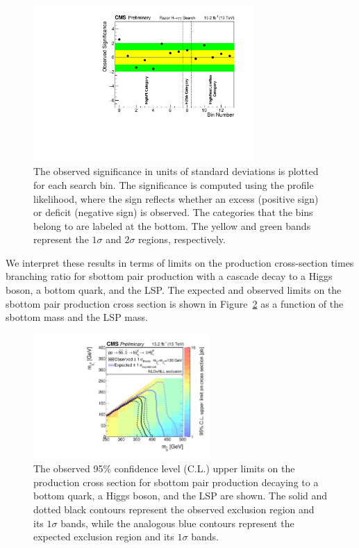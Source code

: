 \begin{figure}[ht!]
\centering
\includegraphics[width=0.75\textwidth, angle=0.]{figs/SignificanceVsBin.pdf}
\caption{ 
The observed significance in units of standard deviations
is plotted for each search bin. The significance is computed using the profile likelihood, where the sign
reflects whether an excess (positive sign) or deficit (negative sign) is observed. 
The categories that the bins belong to are labeled at the bottom.
The yellow and green bands represent the $1\sigma$ and $2\sigma$
regions, respectively. 
\label{fig:Significance}}
\end{figure}


We interpret these results in terms of limits on the production cross-section times
branching ratio for sbottom pair production with a cascade decay to a Higgs 
boson, a bottom quark, and the LSP. The expected and observed limits on the sbottom pair production cross section 
is shown in Figure~\ref{fig:Limits} as a function of the
sbottom mass and the LSP mass. 

\begin{figure}[ht!]
\centering
\includegraphics[width=0.6\textwidth,angle=0.]{figs/limits/T2bH_Aug2XSEC.pdf}
\caption{ 
The observed 95\% confidence level (C.L.) upper limits on the production cross section
for sbottom pair production decaying to a bottom quark, a Higgs boson, and the LSP
are shown. The solid and dotted black contours represent the observed exclusion region and
its $1\sigma$ bands, while the analogous blue contours represent the expected
exclusion region and its $1\sigma$ bands.
\label{fig:Limits}}
\end{figure}


